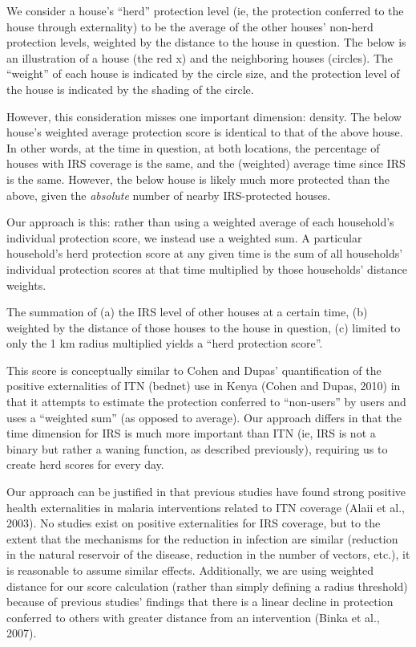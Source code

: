 \documentclass[]{article}
\begin{document}
We consider a house's ``herd'' protection level (ie, the protection
conferred to the house through externality) to be the average of the
other houses' non-herd protection levels, weighted by the distance to
the house in question. The below is an illustration of a house (the red
x) and the neighboring houses (circles). The ``weight'' of each house is
indicated by the circle size, and the protection level of the house is
indicated by the shading of the circle.

However, this consideration misses one important dimension: density. The
below house's weighted average protection score is identical to that of
the above house. In other words, at the time in question, at both
locations, the percentage of houses with IRS coverage is the same, and
the (weighted) average time since IRS is the same. However, the below
house is likely much more protected than the above, given the
\emph{absolute} number of nearby IRS-protected houses.

Our approach is this: rather than using a weighted average of each
household's individual protection score, we instead use a weighted sum.
A particular household's herd protection score at any given time is the
sum of all households' individual protection scores at that time
multiplied by those households' distance weights.

The summation of (a) the IRS level of other houses at a certain time,
(b) weighted by the distance of those houses to the house in question,
(c) limited to only the 1 km radius multiplied yields a ``herd
protection score''.

This score is conceptually similar to Cohen and Dupas' quantification of
the positive externalities of ITN (bednet) use in Kenya (Cohen and
Dupas, 2010) in that it attempts to estimate the protection conferred to
``non-users'' by users and uses a ``weighted sum'' (as opposed to
average). Our approach differs in that the time dimension for IRS is
much more important than ITN (ie, IRS is not a binary but rather a
waning function, as described previously), requiring us to create herd
scores for every day.

Our approach can be justified in that previous studies have found strong
positive health externalities in malaria interventions related to ITN
coverage (Alaii et al., 2003). No studies exist on positive
externalities for IRS coverage, but to the extent that the mechanisms
for the reduction in infection are similar (reduction in the natural
reservoir of the disease, reduction in the number of vectors, etc.), it
is reasonable to assume similar effects. Additionally, we are using
weighted distance for our score calculation (rather than simply defining
a radius threshold) because of previous studies' findings that there is
a linear decline in protection conferred to others with greater distance
from an intervention (Binka et al., 2007).
\end{document}
